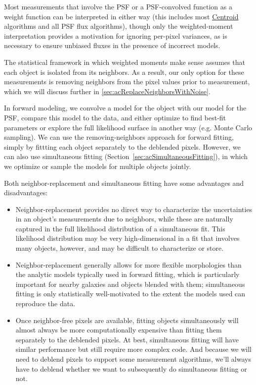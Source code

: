 Most measurements that involve the PSF or a PSF-convolved function as a weight function can be interpreted in either way (this includes most \hyperref[sec:acCentroidAlgorithms]{Centroid} algorithms and all PSF flux algorithms), though only the weighted-moment interpretation provides a motivation for ignoring per-pixel variances, as is necessary to ensure unbiased fluxes in the presence of incorrect models.

The statistical framework in which weighted moments make sense assumes that each object is isolated from its neighbors.  As a result, our only option for these measurements is removing neighbors from the pixel values prior to measurement, which we will discuss further in \ref{sec:acReplaceNeighborsWithNoise}.

In forward modeling, we convolve a model for the object with our model for the PSF, compare this model to the data, and either optimize to find best-fit parameters or explore the full likelihood surface in another way (e.g. Monte Carlo sampling).  We can use the removing-neighbors approach for forward fitting, simply by fittting each object separately to the deblended pixels.  However, we can also use simultaneous fitting (Section~\ref{sec:acSimultaneousFitting}), in which we optimize or sample the models for multiple objects jointly.

Both neighbor-replacement and simultaneous fitting have some advantages and disadvantages:
\begin{itemize}
\item Neighbor-replacement provides no direct way to characterize the uncertainties in an object's measurements due to neighbors, while these are naturally captured in the full likelihood distribution of a simultaneous fit.  This likelihood distribution may be very high-dimensional in a fit that involves many objects, however, and may be difficult to characterize or store.
\item Neighbor-replacement generally allows for more flexible morphologies than the analytic models typically used in forward fitting, which is particularly important for nearby galaxies and objects blended with them; simultaneous fitting is only statistically well-motivated to the extent the models used can reproduce the data.
\item Once neighbor-free pixels are available, fitting objects simultaneously will almost always be more computationally expensive than fitting them separately to the deblended pixels.  At best, simultaneous fitting will have similar performance but still require more complex code.  And because we will need to deblend pixels to support some measurement algorithms, we'll always have to deblend whether we want to subsequently do simultaneous fitting or not.
\end{itemize}

